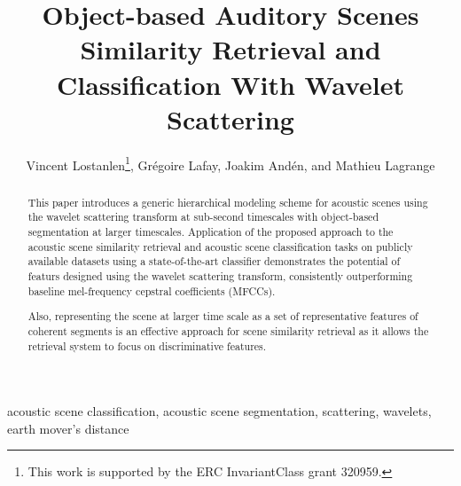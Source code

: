 \documentclass[journal]{IEEEtran}
\begin{document}
%
\title{Object-based Auditory Scenes Similarity Retrieval and Classification With Wavelet Scattering}

\author{Vincent Lostanlen\thanks{This work is supported by the ERC InvariantClass grant 320959.}, Gr\'egoire Lafay, Joakim And\'en, and Mathieu Lagrange}


\maketitle

\begin{abstract}

This paper introduces a generic hierarchical modeling scheme for acoustic scenes using the wavelet scattering transform at sub-second timescales with object-based segmentation at larger timescales. Application of the proposed approach to the acoustic scene similarity retrieval and acoustic scene classification tasks on publicly available datasets using a state-of-the-art classifier demonstrates the potential of featurs designed using the wavelet scattering transform, consistently outperforming baseline mel-frequency cepstral coefficients (MFCCs).

Also, representing the scene at larger time scale as a set of representative features of coherent segments is an effective approach for scene similarity retrieval as it allows the retrieval system to focus on discriminative features. 
\end{abstract}

\begin{IEEEkeywords}
acoustic scene classification, acoustic scene segmentation, scattering, wavelets, earth mover's distance
\end{IEEEkeywords}

%
\IEEEpeerreviewmaketitle
\end{document}
